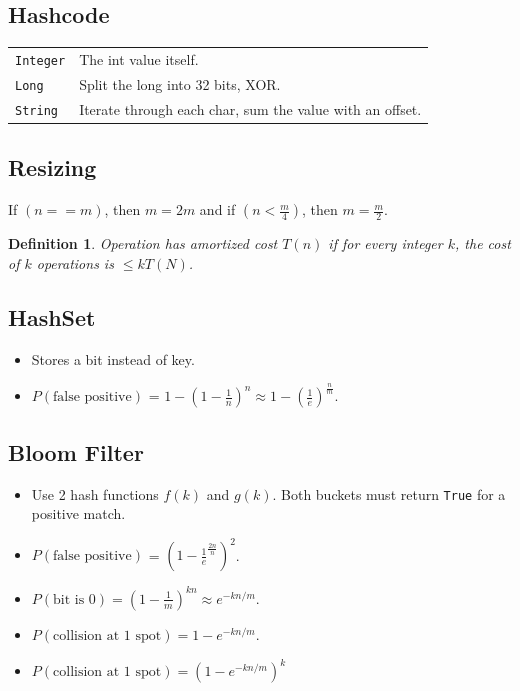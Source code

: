 \documentclass[10pt,landscape,a4paper]{article}
\newtheorem{definition}{Definition}[section]
\begin{document}
\begin{multicols*}{4}
\subsection{Hashcode}
\begin{tabular}{p{1.5cm} p{4.5cm}}
    \verb!Integer!      &   The int value itself. \\
    \verb!Long!         &   Split the long into 32 bits, XOR. \\
    \verb!String!       &   Iterate through each char, sum the value with an offset. \\
\end{tabular}

\subsection{Resizing}
If $(n == m)$, then $m = 2m$ and if $(n < \frac{m}{4})$, then $m = \frac{m}{2}$. \\
\begin{definition}
    Operation has amortized cost $T(n)$ if for every integer $k$, the cost of $k$ operations is $\le k T(N)$.
\end{definition}

\subsection{HashSet}
\begin{itemize}
    \item Stores a bit instead of key.
    \item $P(\text{false positive})$ = $1 - (1-\frac{1}{n})^n \approx 1 - (\frac{1}{e})^{\frac{n}{m}}$.
\end{itemize}

\subsection{Bloom Filter}
\begin{itemize}
    \item Use 2 hash functions $f(k)$ and $g(k)$. Both buckets must return \texttt{True} for a positive match.
    \item $P(\text{false positive})$ = $(1 - \frac{1}{e}^{\frac{2n}{n}})^2$.
    \item $P(\text{bit is 0}) = (1 - \frac{1}{m})^{kn} \approx e^{-kn/m}$.
    \item $P(\text{collision at 1 spot}) = 1 - e^{-kn/m}$.
    \item $P(\text{collision at 1 spot}) = (1 - e^{-kn/m})^k$


\end{itemize}
\end{multicols*}
\end{document}
